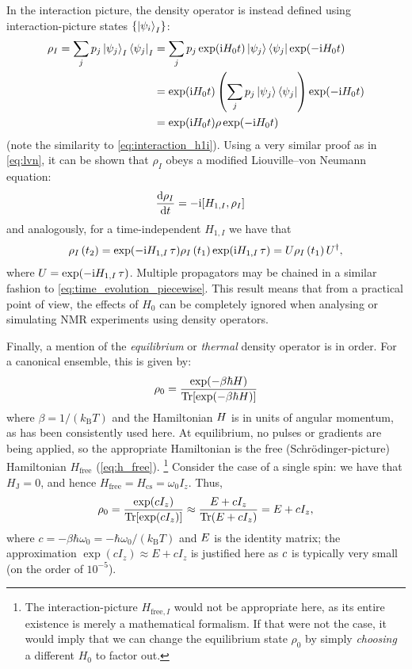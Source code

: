 In the interaction picture, the density operator is instead defined using interaction-picture states $\{\ket{\psi_i}_I\}$:
\begin{align}
    \label{eq:density_matrix_interaction}
    \rho_I = \sum_j p_j \ket{\psi_j}_I \bra{\psi_j}_I
           &= \sum_j p_j \exp(\mathrm{i} H_0 t)\ket{\psi_j} \bra{\psi_j} \exp(-\mathrm{i} H_0 t) \notag \\
           &= \exp(\mathrm{i} H_0 t) \left(\sum_j p_j \ket{\psi_j} \bra{\psi_j}\right) \exp(-\mathrm{i} H_0 t) \notag \\
           &= \exp(\mathrm{i} H_0 t) \rho \exp(-\mathrm{i} H_0 t)
\end{align}
(note the similarity to \cref{eq:interaction_h1i}).
Using a very similar proof as in \cref{eq:lvn}, it can be shown that $\rho_I$ obeys a modified Liouville--von Neumann equation:
\begin{align}
    \label{eq:lvn_interaction}
    \frac{\mathrm{d}\rho_I}{\mathrm{d}t} &= -\mathrm{i}[H_{1,I}, \rho_I]
\end{align}
and analogously, for a time-independent $H_{1,I}$ we have that
\begin{align}
    \label{eq:lvn_interaction_integrated}
    \rho_I\,(t_2) = \exp(-\mathrm{i} H_{1,I}\,\tau)\rho_I\,(t_1)\exp(\mathrm{i} H_{1,I}\,\tau) = U\rho_I\,(t_1) \, U^\dagger,
\end{align}
where $U = \exp(-\mathrm{i} H_{1,I}\,\tau)$.
Multiple propagators may be chained in a similar fashion to \cref{eq:time_evolution_piecewise}.
This result means that from a practical point of view, the effects of $H_0$ can be completely ignored when analysing or simulating NMR experiments using density operators.

Finally, a mention of the \textit{equilibrium} or \textit{thermal} density operator is in order.
For a canonical ensemble, this is given by:
\begin{equation}
    \label{eq:thermal_density_operator}
    \rho_0 = \frac{\exp(-\beta\hbar H)}{\operatorname{Tr}[\exp(-\beta\hbar H)]}
\end{equation}
where $\beta = 1/(k_\mathrm{B}T)$ and the Hamiltonian $H\/$ is in units of angular momentum, as has been consistently used here.
At equilibrium, no pulses or gradients are being applied, so the appropriate Hamiltonian is the free (Schr\"odinger-picture) Hamiltonian $H_\text{free}$ (\cref{eq:h_free}).%
\footnote{The interaction-picture $H_{\text{free},I}$ would not be appropriate here, as its entire existence is merely a mathematical formalism. If that were not the case, it would imply that we can change the equilibrium state $\rho_0$ by simply \textit{choosing} a different $H_0$ to factor out.}
Consider the case of a single spin: we have that $H_\text{J} = 0$, and hence $H_\text{free} = H_\text{cs} = \omega_0 I_z$. Thus,
\begin{equation}
    \label{eq:nmr_equilibrium_rho}
    \rho_0 = \frac{\exp(cI_z)}{\operatorname{Tr}[\exp(cI_z)]} \approx \frac{E + cI_z}{\operatorname{Tr}(E + cI_z)} = E + cI_z,
\end{equation}
where $c = -\beta\hbar\omega_0 = -\hbar\omega_0/(k_\mathrm{B}T)$ and $E\/$ is the identity matrix; the approximation $\exp(cI_z) \approx E + cI_z$ is justified here as $c\/$ is typically very small (on the order of $10^{-5}$).

